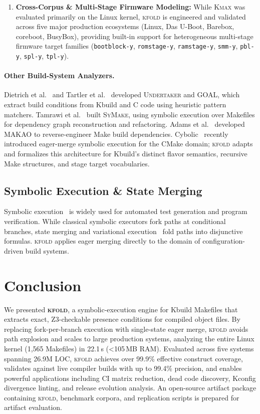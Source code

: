 \documentclass[acmsmall,screen,review]{acmart}
\newcommand{\tool}{\textsc{kfold}\xspace}
\begin{document}
\begin{enumerate}
\item \textbf{Cross-Corpus \& Multi-Stage Firmware Modeling:} While \textsc{Kmax} was evaluated primarily on the Linux kernel, \tool is engineered and validated across five major production ecosystems (Linux, Das U-Boot, Barebox, coreboot, BusyBox), providing built-in support for heterogeneous multi-stage firmware target families (\texttt{bootblock-y}, \texttt{romstage-y}, \texttt{ramstage-y}, \texttt{smm-y}, \texttt{pbl-y}, \texttt{spl-y}, \texttt{tpl-y}).
\end{enumerate}

\paragraph{Other Build-System Analyzers.}
Dietrich et al.~\cite{dietrich2012variability} and Tartler et al.~\cite{tartler2011dead} developed \textsc{Undertaker} and \textsc{GOAL}, which extract build conditions from Kbuild and C code using heuristic pattern matchers. Tamrawi et al.~\cite{tamrawi2012symake} built \textsc{SyMake}, using symbolic execution over Makefiles for dependency graph reconstruction and refactoring. Adams et al.~\cite{adams2007makao} developed \textsc{MAKAO} to reverse-engineer Make build dependencies. Cybolic~\cite{cybolic} recently introduced eager-merge symbolic execution for the CMake domain; \tool adapts and formalizes this architecture for Kbuild's distinct flavor semantics, recursive Make structures, and stage target vocabularies.

\subsection{Symbolic Execution \& State Merging}
Symbolic execution~\cite{king1976symbolic,cadar2008klee,godefroid2005dart} is widely used for automated test generation and program verification. While classical symbolic executors fork paths at conditional branches, state merging and variational execution~\cite{kuznetsov2012efficient,nguyen2014using,nguyen2020kbuild} fold paths into disjunctive formulas. \tool applies eager merging directly to the domain of configuration-driven build systems.

\section{Conclusion}
\label{sec:conclusion}

We presented \textbf{\tool}, a symbolic-execution engine for Kbuild Makefiles that extracts exact, Z3-checkable presence conditions for compiled object files. By replacing fork-per-branch execution with single-state eager merge, \tool avoids path explosion and scales to large production systems, analyzing the entire Linux kernel (1,565 Makefiles) in 22.1\,s (<105\,MB RAM). Evaluated across five systems spanning 26.9M LOC, \tool achieves over 99.9\% effective construct coverage, validates against live compiler builds with up to 99.4\% precision, and enables powerful applications including CI matrix reduction, dead code discovery, Kconfig divergence linting, and release evolution analysis. An open-source artifact package containing \tool, benchmark corpora, and replication scripts is prepared for artifact evaluation.



\end{document}
